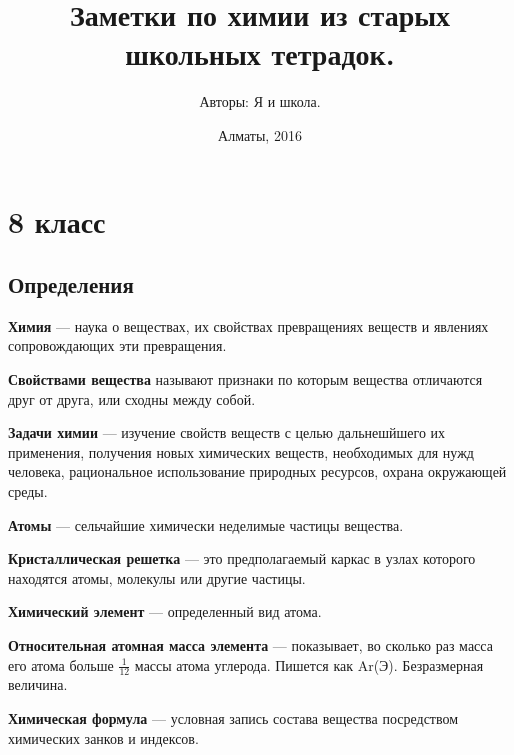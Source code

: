 \documentclass[12pt,a4paper]{article}
\title{Заметки по химии из старых школьных тетрадок.}
\author{Авторы: Я и школа.}
\date{Алматы, 2016}
\begin{document}

\maketitle

\tableofcontents

\thispagestyle{empty}


\newpage

\setcounter{page}{1} %

\section{8 класс}

\subsection{Определения}

{\bfseries Химия} --- наука о веществах, их свойствах превращениях веществ и явлениях сопровождающих эти превращения.

{\bfseries Свойствами вещества} называют признаки по которым вещества отличаются друг от друга, или сходны между собой.

{\bfseries Задачи химии} ---  изучение свойств веществ с целью дальнешйшего их применения, получения новых химических веществ, необходимых для нужд человека, рациональное использование природных ресурсов, охрана окружающей среды.

{\bfseries Атомы} --- сельчайшие химически неделимые частицы вещества.

{\bfseries Кристаллическая решетка} --- это предполагаемый каркас в узлах которого находятся атомы, молекулы или другие частицы.

{\bfseries Химический элемент} --- определенный вид атома.

{\bfseries Относительная атомная масса элемента} --- показывает, во сколько раз масса его атома больше $\frac{1}{12}$ массы атома углерода. Пишется как Ar(Э). Безразмерная величина.

{\bfseries Химическая формула} --- условная запись состава вещества посредством химических занков и индексов.
\end{document}
